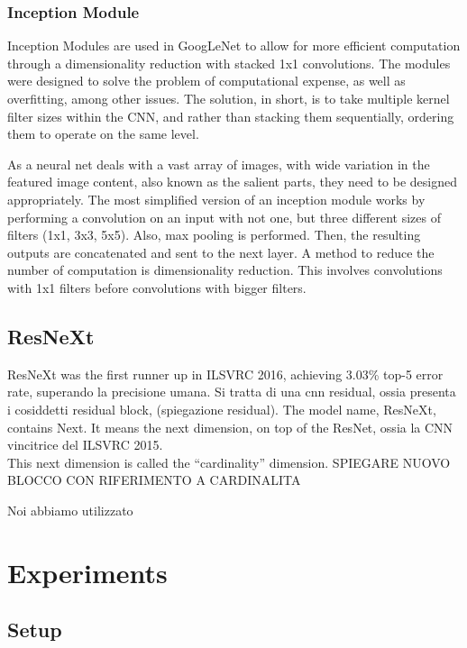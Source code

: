 \documentclass{article}
\begin{document}
\subsubsection{Inception Module}
Inception Modules are used in GoogLeNet to allow for more efficient computation through a dimensionality reduction with stacked 1x1 convolutions. The modules were designed to solve the problem of computational expense, as well as overfitting, among other issues. The solution, in short, is to take multiple kernel filter sizes within the CNN, and rather than stacking them sequentially, ordering them to operate on the same level. 

As a neural net deals with a vast array of images, with wide variation in the featured image content, also known as the salient parts, they need to be designed appropriately. The most simplified version of an inception module works by performing a convolution on an input with not one, but three different sizes of filters (1x1, 3x3, 5x5). Also, max pooling is performed. Then, the resulting outputs are concatenated and sent to the next layer.
A method to reduce the number of computation is dimensionality reduction. This involves convolutions with 1x1 filters before convolutions with bigger filters.

\subsection{ResNeXt}
ResNeXt was the first runner up in ILSVRC 2016, achieving 3.03\% top-5 error rate, superando la precisione umana.
Si tratta di una cnn residual, ossia presenta i cosiddetti residual block, (spiegazione residual).
The model name, ResNeXt, contains Next. It means the next dimension, on top of the ResNet, ossia la CNN vincitrice del  ILSVRC 2015. \\
This next dimension is called the “cardinality” dimension.
SPIEGARE NUOVO BLOCCO CON RIFERIMENTO A CARDINALITA

Noi abbiamo utilizzato 

\section{Experiments}\label{experiments}

\subsection{Setup}\mbox{}\\
\end{document}

